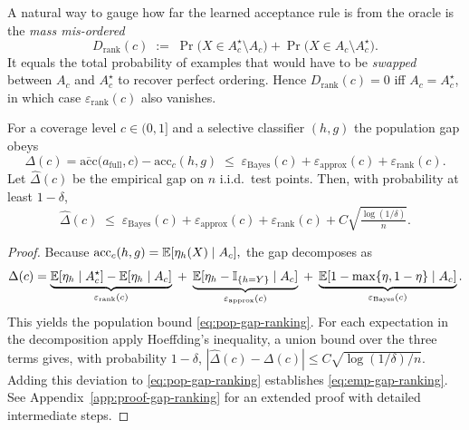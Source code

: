 \begin{remark}
A natural way to gauge how far the learned acceptance rule is from the oracle is
the \emph{mass mis-ordered}
\begin{equation}
    D_{\text{rank}}(c)\;:=\;
    \Pr\bigl(X\in A_c^{\star}\setminus A_c\bigr)
    +\Pr\bigl(X\in A_c\setminus A_c^{\star}\bigr).
\end{equation}
It equals the total probability of examples that would have to be
\emph{swapped} between $A_c$ and $A_c^{\star}$ to recover perfect ordering.
Hence $D_{\text{rank}}(c)=0$ iff $A_c=A_c^{\star}$, in which case
$\varepsilon_{\text{rank}}(c)$ also vanishes.
\end{remark}

\begin{theorem}
\label{thm:gap}
For a coverage level \(c\in(0,1]\) and a selective classifier \((h,g)\) the population gap obeys
\begin{equation}
\Delta(c)=\overline{\mathrm{acc}}\bigl(a_{\mathrm{full}},c\bigr)
-\mathrm{acc}_c(h,g)
\;\le\;
\varepsilon_{\text{Bayes}}(c)
+\varepsilon_{\text{approx}}(c)
+\varepsilon_{\text{rank}}(c).
\label{eq:pop-gap-ranking}
\end{equation}
Let \(\widehat{\Delta}(c)\) be the empirical gap on \(n\) i.i.d.\
test points.  Then, with probability at least \(1-\delta\),
\begin{equation}
\widehat{\Delta}(c)
\;\le\;
\varepsilon_{\text{Bayes}}(c)
+\varepsilon_{\text{approx}}(c)
+\varepsilon_{\text{rank}}(c)
+C\sqrt{\tfrac{\log(1/\delta)}{n}}.
\label{eq:emp-gap-ranking}
\end{equation}
\end{theorem}

\begin{proof}
Because
\(
\mathrm{acc}_c(h,g)=\mathbb{E}[\eta_h(X)\mid A_c],
\)
the gap decomposes as
\[
  \Delta(c)
  =\underbrace{\mathbb{E}[\eta_h\mid A_c^{\star}]
               -\mathbb{E}[\eta_h\mid A_c]}_{\varepsilon_{\text{rank}}(c)}
   \;+\;
   \underbrace{\mathbb{E}[\eta_h-\mathbb{I}_{\{h=Y\}}\mid A_c]}
              _{\varepsilon_{\text{approx}}(c)}
   \;+\;
   \underbrace{\mathbb{E}[1-\max\{\eta,1-\eta\}\mid A_c]}
              _{\varepsilon_{\text{Bayes}}(c)}.
\]
This yields the population bound \eqref{eq:pop-gap-ranking}. 
For each expectation in the decomposition apply Hoeffding’s
inequality, a union bound over the three terms gives, with probability
\(1-\delta\),
\(
  |\widehat{\Delta}(c)-\Delta(c)|
  \le C\sqrt{\log(1/\delta)/n}.
\)
Adding this deviation to \eqref{eq:pop-gap-ranking} establishes
\eqref{eq:emp-gap-ranking}. \\See Appendix~\ref{app:proof-gap-ranking} for an extended proof with detailed intermediate steps.
\end{proof}

